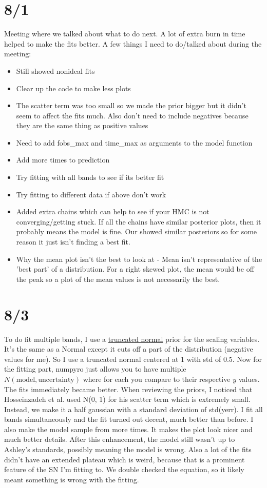 \documentclass[12pt]{article}
\begin{document}
\section{8/1}
Meeting where we talked about what to do next. A lot of extra burn in time helped to make the fits better. A few things I need to do/talked about during the meeting:
\begin{itemize}
        \item Still showed nonideal fits 
        \item Clear up the code to make less plots 
        \item The scatter term was too small so we made the prior bigger but it didn't seem to affect the fits much. Also don't need to include negatives because they are the same thing as positive values
        \item Need to add fobs\_max and time\_max as arguments to the model function 
        \item Add more times to prediction 
        \item Try fitting with all bands to see if its better fit 
        \item Try fitting to different data if above don't work 
        \item Added extra chains which can help to see if your HMC is not converging/getting stuck. If all the chains have similar posterior plots, then it probably means the model is fine. Our showed similar posteriors so for some reason it just isn't finding a best fit. 
        \item Why the mean plot isn't the best to look at - Mean isn't representative of the 'best part' of a distribution. For a right skewed plot, the mean would be off the peak so a plot of the mean values is not necessarily the best. 
\end{itemize}


\section{8/3}
To do fit multiple bands, I use a \href{https://en.wikipedia.org/wiki/Truncated_normal_distribution}{truncated normal} prior for the scaling variables. It's the same as a Normal except it cuts off a part of the distribution (negative values for me). So I use a truncated normal centered at 1 with std of 0.5. Now for the fitting part, numpyro just allows you to have multiple $N(\text{model}, \text{uncertainty})$ where for each you compare to their respective $y$ values. The fits immediately became better. When reviewing the priors, I noticed that Hosseinzadeh et al. used N(0, 1) for his scatter term which is extremely small. Instead, we make it a half gaussian with a standard deviation of std(yerr). I fit all bands simultaneously and the fit turned out decent, much better than before. I also make the model sample from more times. It makes the plot look nicer and much better details. After this enhancement, the model still wasn't up to Ashley's standards, possibly meaning the model is wrong. Also a lot of the fits didn't have an extended plateau which is weird, because that is a prominent feature of the SN I'm fitting to. We double checked the equation, so it likely meant something is wrong with the fitting. 
\end{document}
